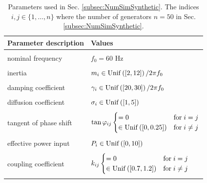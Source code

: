 \documentclass[10pt,twocolumn]{IEEEtran}
\begin{document}
\begin{table}[t]
\centering
\begin{tabular}{| l | l |} 
\hline
Parameter description & Values\\
\hline\hline
&\\
nominal frequency & $f_{0} = 60$ Hz\\
&\\
inertia & $m_{i}\in{\rm{Unif}}\left([2,12]\right)/2\pi f_{0}$\\
& \\
damping coefficient & $\gamma_{i}\in{\rm{Unif}}\left([20,30]\right)/2\pi f_{0}$\\
& \\
diffusion coefficient & $\sigma_{i}\in{\rm{Unif}}\left([1,5]\right)$\\
& \\
tangent of phase shift & $\tan\varphi_{ij}\begin{cases}
=0 & \text{for}\; i=j\\
\in{\rm{Unif}}\left([0,0.25]\right)& \text{for}\; i\neq j
\end{cases}$\\
& \\
effective power input & $P_{i}\in{\rm{Unif}}\left([0,10]\right)$\\
& \\
coupling coefficient & $k_{ij}\begin{cases}
=0 & \text{for}\; i=j\\
\in{\rm{Unif}}\left([0.7,1.2]\right) & \text{for}\; i\neq j	
\end{cases}$\\
& \\
\hline
\end{tabular}
\caption{Parameters used in Sec. \ref{subsec:NumSimSynthetic}. The indices $i,j\in\{1,\hdots,n\}$ where the number of generators $n=50$ in Sec. \ref{subsec:NumSimSynthetic}.}
\label{table:ParamUncertaintiesSynthetic}
\vspace*{-0.2in}
\end{table}
\end{document}
